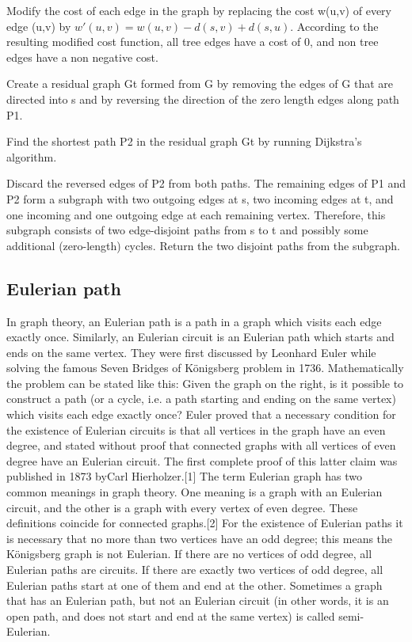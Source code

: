 \documentclass[10pt,letterpaper,twocolumn,twosided]{article}
\begin{document}
Modify the cost of each edge in the graph by replacing the cost w(u,v) of every edge (u,v) 
by $w'(u,v) = w(u,v) - d(s,v) + d(s,u).$ According to the resulting modified cost function, all tree edges have a
cost of 0, and non tree edges have a non negative cost.

Create a residual graph Gt formed from G by removing the edges of G that are directed into s and by reversing 
the direction of the zero length edges along path P1.

Find the shortest path P2 in the residual graph Gt by running Dijkstra's algorithm.

Discard the reversed edges of P2 from both paths. The remaining edges of P1 and P2 form a subgraph with two 
outgoing edges at s, two incoming edges at t, and one incoming and one outgoing edge at each remaining vertex.
Therefore, this subgraph consists of two edge-disjoint paths from s to t and possibly some additional (zero-length)
cycles. Return the two disjoint paths from the subgraph.

\subsection{Eulerian path}

In graph theory, an Eulerian path is a path in a graph which visits each edge exactly once. Similarly, an Eulerian circuit is an Eulerian path which starts and ends on the same vertex. They were first discussed by Leonhard Euler while solving the famous Seven Bridges of Königsberg problem in 1736. Mathematically the problem can be stated like this:
Given the graph on the right, is it possible to construct a path (or a cycle, i.e. a path starting and ending on the same vertex) which visits each edge exactly once?
Euler proved that a necessary condition for the existence of Eulerian circuits is that all vertices in the graph have an even degree, and stated without proof that connected graphs with all vertices of even degree have an Eulerian circuit. The first complete proof of this latter claim was published in 1873 byCarl Hierholzer.[1]
The term Eulerian graph has two common meanings in graph theory. One meaning is a graph with an Eulerian circuit, and the other is a graph with every vertex of even degree. These definitions coincide for connected graphs.[2]
For the existence of Eulerian paths it is necessary that no more than two vertices have an odd degree; this means the Königsberg graph is not Eulerian. If there are no vertices of odd degree, all Eulerian paths are circuits. If there are exactly two vertices of odd degree, all Eulerian paths start at one of them and end at the other. Sometimes a graph that has an Eulerian path, but not an Eulerian circuit (in other words, it is an open path, and does not start and end at the same vertex) is called semi-Eulerian.
\end{document}
